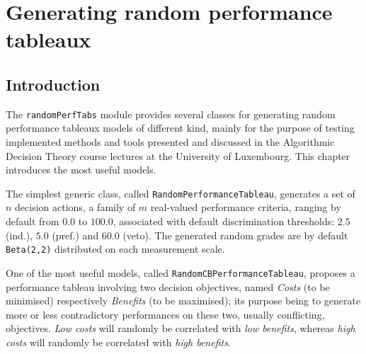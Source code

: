 \chapter{Generating random performance tableaux}
\label{sec:6}



\section{Introduction}
\label{sec:6.1}

The \texttt{randomPerfTabs} module provides several classes for generating random performance tableaux models of different kind, mainly for the purpose of testing implemented methods and tools presented and discussed in the Algorithmic Decision Theory course lectures at the University of Luxembourg. This chapter introduces the most useful models.

The simplest generic class, called \texttt{RandomPerformanceTableau}, generates a set of $n$ decision actions, a family of $m$ real-valued performance criteria, ranging by default from $0.0$ to $100.0$, associated with default discrimination thresholds: $2.5$ (ind.), $5.0$ (pref.) and $60.0$ (veto). The generated random grades are by default \texttt{Beta(2,2)} distributed on each measurement scale.

One of the most useful models, called \texttt{RandomCBPerformanceTableau}\index{}, proposes a performance tableau involving two decision objectives, named \emph{Costs} (to be minimised) respectively \emph{Benefits} (to be maximised); its purpose being to generate more or less contradictory performances on these two, usually conflicting, objectives. \emph{Low costs} will randomly be correlated with \emph{low benefits}, whereas \emph{high costs} will randomly be correlated with \emph{high benefits}.

